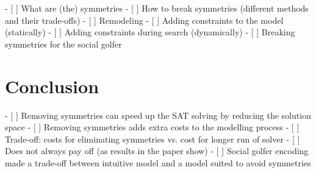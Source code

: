\documentclass[a4paper]{scrartcl}
\begin{document}
- [ ] What are (the) symmetries
- [ ] How to break symmetries (different methods and their trade-offs)
    - [ ] Remodeling
    - [ ] Adding constraints to the model (statically)
    - [ ] Adding constraints during search (dynamically)
- [ ] Breaking symmetries for the social golfer

\section{Conclusion}

- [ ] Removing symmetries can speed up the SAT solving by reducing the
      solution space
- [ ] Removing symmetries adds extra costs to the modelling process
    - [ ] Trade-off: costs for eliminating symmetries vs. cost for
          longer run of solver
    - [ ] Does not always pay off (as results in the paper show)
- [ ] Social golfer encoding made a trade-off between intuitive model
      and a model suited to avoid symmetries
\end{document}
